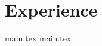 \section{Experience}
  \resumeSubHeadingListStart

    {main.tex}
    {main.tex}
    
  \resumeSubHeadingListEnd
\vspace{-14pt}
